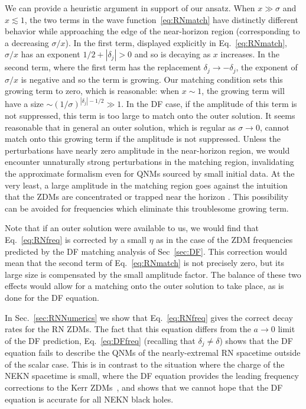 \begin{refsection}
We can provide a heuristic argument in support of our ansatz. 
When $x \gg \sigma$ and $x \lesssim 1$, the two terms in the wave function~\eqref{eq:RNmatch} have distinctly different behavior while approaching the edge of the near-horizon region (corresponding to a decreasing $\sigma/x$). 
In the first term, displayed explicitly in Eq.~\eqref{eq:RNmatch}, $\sigma /x$ has an exponent  $1/2 + |\delta_j| >0$ and so is decaying as $x$ increases. In the second term, where the first term has the replacement $\delta_j \to - \delta_j$, the exponent of $\sigma/x$ is negative and so the term is growing. 
Our matching condition sets this growing term to zero, which is reasonable: when $x \sim 1$, the growing term will have a size $\sim (1/\sigma)^{|\delta_j| -1/2} \gg 1$. 
In the DF case, if the amplitude of this term is not suppressed, this term is too large to match onto the outer solution. 
It seems reasonable that in general an outer solution, which is regular as $\sigma \to 0$, cannot match onto this growing term if the amplitude is not suppressed.
Unless the perturbations have nearly zero amplitude in the near-horizon region, we would encounter unnaturally strong perturbations in the matching region, invalidating the approximate formalism even for QNMs sourced by small initial data.
At the very least, a large amplitude in the matching region goes against the intuition that the ZDMs are concentrated or trapped near the horizon \cite{Andersson2000}. 
This possibility can be avoided for frequencies which eliminate this troublesome growing term.


Note that if an outer solution were available to us, we would find that Eq.~\eqref{eq:RNfreq} is corrected by a small $\eta$ as in the case of the ZDM frequencies predicted by the DF matching analysis of Sec~\ref{sec:DF}. 
This correction would mean that the second term of Eq.~\eqref{eq:RNmatch} is not precisely zero, but its large size is compensated by the small amplitude factor. 
The balance of these two effects would allow for a matching onto the outer solution to take place, as is done for the DF equation.

In Sec.~\ref{sec:RNNumerics} we show that Eq.~\eqref{eq:RNfreq} gives the correct decay rates for the RN ZDMs. 
The fact that this equation differs from the $a \to 0$ limit of the DF prediction, Eq.~\eqref{eq:DFfreq} (recalling that $\delta_j \neq \delta$) shows that the DF equation fails to describe the QNMs of the nearly-extremal RN spacetime outside of the scalar case. 
This is in contrast to the situation where the charge of the NEKN spacetime is small, where the DF equation provides the leading frequency corrections to the Kerr ZDMs~\cite{Mark:2014aja}, and shows that we cannot hope that the DF equation is accurate for all NEKN black holes.


\end{refsection}
